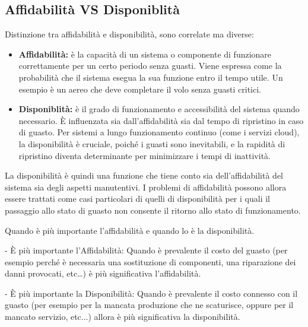 \documentclass{report}
\begin{document}
\subsection{Affidabilità VS Disponiblità}
Distinzione tra affidabilità e disponibilità, sono correlate ma diverse:
\begin{itemize}
    \item \textbf{Affidabilità:} è la capacità di un sistema o componente di funzionare correttamente per un certo periodo senza guasti. Viene espressa come la probabilità che il sistema esegua la sua funzione entro il tempo utile. Un esempio è un aereo che deve completare il volo senza guasti critici.
    \item \textbf{Disponiblità:} è il grado di funzionamento e accessibilità del sistema quando necessario. È influenzata sia dall'affidabilità sia dal tempo di ripristino in caso di guasto. Per sistemi a lungo funzionamento continuo (come i servizi cloud), la disponibilità è cruciale, poiché i guasti sono inevitabili, e la rapidità di ripristino diventa determinante per minimizzare i tempi di inattività. 
\end{itemize}
La disponibilità è quindi una funzione che tiene conto sia dell’affidabilità
del sistema sia degli aspetti manutentivi.
I problemi di affidabilità possono allora essere trattati come casi
particolari di quelli di disponibilità per i quali il passaggio allo stato di
guasto non consente il ritorno allo stato di funzionamento.

\noindent Quando è più importante l’affidabilità e quando lo è la disponibilità.

- È più importante l’Affidabilità:
Quando è prevalente il costo del guasto (per esempio perché è necessaria
una sostituzione di componenti, una riparazione dei danni provocati, etc…)
è più significativa l'affidabilità.

- È più importante la Disponibilità:
Quando è prevalente il costo connesso con il guasto (per esempio per la
mancata produzione che ne scaturisce, oppure per il mancato servizio,
etc...) allora è più significativa la disponibilità.
\end{document}

